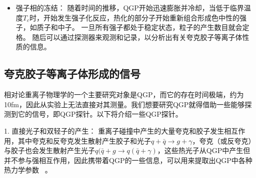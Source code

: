 \begin{itemize}
		\item 强子相的冻结：
		随着时间的推移，QGP开始迅速膨胀并冷却，当低于临界温度$T_c$时，开始发生强子化反应，热化的部分子开始重新组合形成色中性的强子，如质子和中子。
		一旦所有强子都处于稳定状态，粒子的产生数目就会定格。%
		随后可以通过探测器来观测和记录，以分析出有关夸克胶子等离子体性质的信息。
	\end{itemize}

	\hspace*{\fill}


\subsection{夸克胶子等离子体形成的信号}
	
	  相对论重离子物理学的一个主要研究对象是QGP，而它的存在时间极端，约为 10fm，因此从实验上无法直接对其测量。我们想要研究QGP就得借助一些能够探测到它的信号，即QGP探针。以下将介绍一些QGP探针。

	   1. 直接光子和双轻子的产生：
	重离子碰撞中产生的大量夸克和胶子发生相互作用，其中夸克和反夸克发生散射产生胶子和光子$q+\bar{q} \to g+\gamma$，夸克（或反夸克）与胶子也会发生散射产生光子$q(\bar{q}+g\to q(\bar{q}+\gamma)$，这些热光子从QGP中产生但并不参与强相互作用，因此携带着QGP的一些信息，可以用来提取出QGP中各种热力学参数 ~\parencite{McLerran:1984ay,Rapp:1999ej}。
	  
